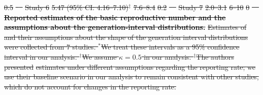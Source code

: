 \documentclass[12pt]{article}
\newcommand{\Ro}{\ensuremath{{\mathcal R}_{0}}\xspace}
\providecommand{\DIFdeltex}[1]{{\protect\color{red}\sout{#1}}}                      %
\providecommand{\DIFdelFL}[1]{\DIFdel{#1}} %
\providecommand{\DIFdel}[1]{\texorpdfstring{\DIFdeltex{#1}}{}} %
\begin{document}
\DIFdelFL{0.5 }%
\DIFdelFL{\mbox{%
\cite{riouncov} }\hspace{0pt}%
}%
\DIFdelFL{Study 6 }%
\DIFdelFL{5.47 (95\% CI: 4.16--7.10)$^\ddagger$ }%
\DIFdelFL{7.6--8.4 }%
\DIFdelFL{0.2 }%
\DIFdelFL{\mbox{%
\cite{zhaoncov} }\hspace{0pt}%
}%
\DIFdelFL{Study 7 }%
\DIFdelFL{2.0--3.1 }%
\DIFdelFL{6--10 }%
\DIFdelFL{0 }%
\DIFdelFL{\mbox{%
\cite{majumderncov} }\hspace{0pt}%
}%
{%
\textbf{\DIFdelFL{Reported estimates of the basic reproductive number and the assumptions about the generation-interval distributions.}}
\DIFdelFL{Estimates of }%
\DIFdelFL{and their assumptions about the shape of the generation interval distributions were collected from 7 studies.
$^\ast$We treat these intervals as a 95\% confidence interval in our analysis.
$^\dagger$We assume $\kappa = 0.5$ in our analysis.
$^\ddagger$The authors presented }%
\DIFdelFL{estimates under different assumptions regarding the reporting rate; we use their baseline scenario in our analysis to remain consistent with other studies, which do not account for changes in the reporting rate.
}}
\end{document}
